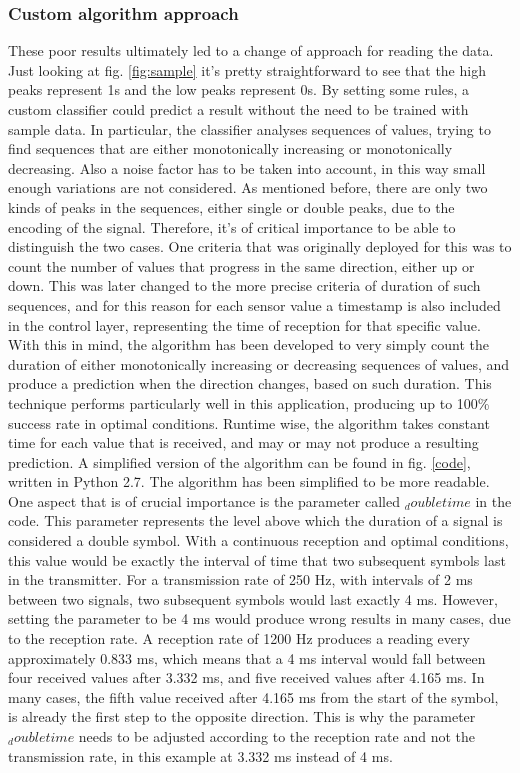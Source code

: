 \subsubsection{Custom algorithm approach}
These poor results ultimately led to a change of approach for reading the data. 
Just looking at fig. \ref{fig:sample} it's pretty straightforward to see that the high peaks represent 1s and the low peaks represent 0s. 
By setting some rules, a custom classifier could predict a result without the need to be trained with sample data.
In particular, the classifier analyses sequences of values, trying to find sequences that are either monotonically increasing or monotonically decreasing.
Also a noise factor has to be taken into account, in this way small enough variations are not considered.
As mentioned before, there are only two kinds of peaks in the sequences, either single or double peaks, due to the encoding of the signal.
Therefore, it's of critical importance to be able to distinguish the two cases. One criteria that was originally deployed for this was to count the number of values that progress in the same direction, either up or down. 
This was later changed to the more precise criteria of duration of such sequences, and for this reason for each sensor value a timestamp is also included in the control layer, representing the time of reception for that specific value.\\ 
With this in mind, the algorithm has been developed to very simply count the duration of either monotonically increasing or decreasing sequences of values, and produce a prediction when the direction changes, based on such duration.
This technique performs particularly well in this application, producing up to 100\% success rate in optimal conditions.
 Runtime wise, the algorithm takes constant time for each value that is received, and may or may not produce a resulting prediction.
A simplified version of the algorithm can be found in fig. \ref{code}, written in Python 2.7.
The algorithm has been simplified to be more readable.
One aspect that is of crucial importance is the parameter called $_doubletime$ in the code.
This parameter represents the level above which the duration of a signal is considered a double symbol.
With a continuous reception and optimal conditions, this value would be exactly the interval of time that two subsequent symbols last in the transmitter.
For a transmission rate of 250 Hz, with intervals of 2 ms between two signals, two subsequent symbols would last exactly 4 ms.
However, setting the parameter to be 4 ms would produce wrong results in many cases, due to the reception rate.
A reception rate of 1200 Hz produces a reading every approximately 0.833 ms, which means that a 4 ms interval would fall between four received values after 3.332 ms, and five received values after 4.165 ms.
In many cases, the fifth value received after 4.165 ms from the start of the symbol, is already the first step to the opposite direction.
This is why the parameter $_doubletime$ needs to be adjusted according to the reception rate and not the transmission rate, in this example at 3.332 ms instead of 4 ms.

